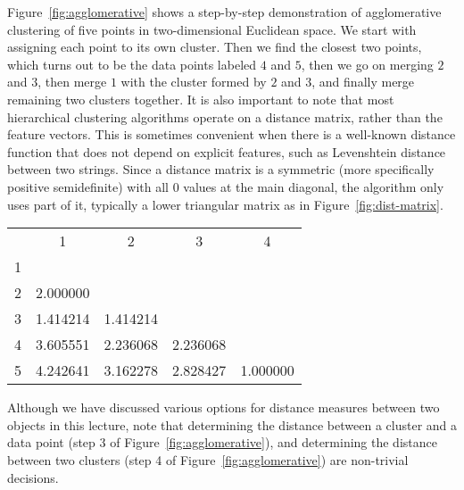 Figure~\ref{fig:agglomerative} shows a step-by-step demonstration
of agglomerative clustering of five points in two-dimensional Euclidean space.
We start with assigning each point to its own cluster.
Then we find the closest two points,
which turns out to be the data points labeled $4$ and $5$,
then we go on merging $2$ and $3$,
then merge $1$ with the cluster formed by $2$ and $3$,
and finally merge remaining two clusters together.
It is also important to note that most hierarchical clustering algorithms
operate on a distance matrix,
rather than the feature vectors.
This is sometimes convenient when there is a well-known distance function
that does not depend on explicit features,
such as Levenshtein distance between two strings.
Since a distance matrix is a symmetric
(more specifically positive semidefinite) with all \num{0} values
at the main diagonal,
the algorithm only uses part of it,
typically a lower triangular matrix as in Figure~\ref{fig:dist-matrix}.
\begin{marginfigure}
  \begin{center}
    \begin{tabular}{lSSSS}
      &        {1}&        {2}&        {3}&        {4}\\
      1&         &         &         &         \\
      2& 2.000000&         &         &         \\
      3& 1.414214& 1.414214&         &         \\
      4& 3.605551& 2.236068& 2.236068&         \\
      5& 4.242641& 3.162278& 2.828427& 1.000000\\
    \end{tabular}
  \end{center}
  \caption{\label{fig:dist-matrix}%
    The distance matrix used as input to the demonstration
    in Figure~\ref{fig:agglomerative}
    (using Euclidean distances).
    We do not need to specify the upper triangular part as
    the matrix is symmetric, and the diagonal entries are all \num{0}.
  }
\end{marginfigure}

Although we have discussed
various options for distance measures between two objects
in this lecture, 
note that determining the distance between a cluster and a data point
(step \num{3} of Figure~\ref{fig:agglomerative}),
and determining the distance between two clusters
(step \num{4} of Figure~\ref{fig:agglomerative})
are non-trivial decisions.

